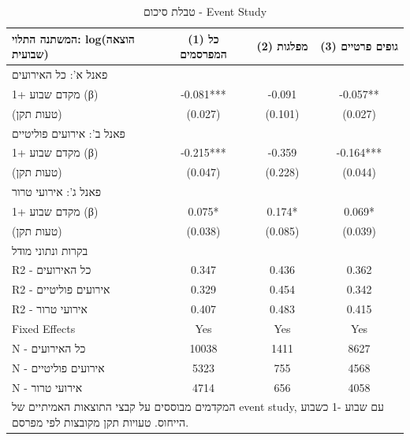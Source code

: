 \begin{table}[!htbp]
\centering
\caption{טבלת סיכום - Event Study}
\label{tab:event_study_panel_summary_baseline_minus1}
\begin{tabular}{lccc}
\hline\hline
המשתנה התלוי: log(הוצאה שבועית) & (1) כל המפרסמים & (2) מפלגות & (3) גופים פרטיים \\
\hline
\multicolumn{4}{l}{פאנל א': כל האירועים} \\
מקדם שבוע +1 (β) & -0.081*** & -0.091 & -0.057** \\
(טעות תקן) & (0.027) & (0.101) & (0.027) \\
\multicolumn{4}{l}{פאנל ב': אירועים פוליטיים} \\
מקדם שבוע +1 (β) & -0.215*** & -0.359 & -0.164*** \\
(טעות תקן) & (0.047) & (0.228) & (0.044) \\
\multicolumn{4}{l}{פאנל ג': אירועי טרור} \\
מקדם שבוע +1 (β) & 0.075* & 0.174* & 0.069* \\
(טעות תקן) & (0.038) & (0.085) & (0.039) \\
\multicolumn{4}{l}{בקרות ונתוני מודל} \\
R2 - כל האירועים & 0.347 & 0.436 & 0.362 \\
R2 - אירועים פוליטיים & 0.329 & 0.454 & 0.342 \\
R2 - אירועי טרור & 0.407 & 0.483 & 0.415 \\
Fixed Effects & Yes & Yes & Yes \\
N - כל האירועים & 10038 & 1411 & 8627 \\
N - אירועים פוליטיים & 5323 & 755 & 4568 \\
N - אירועי טרור & 4714 & 656 & 4058 \\
\hline
\multicolumn{4}{l}{\footnotesize המקדמים מבוססים על קבצי התוצאות האמיתיים של event study, עם שבוע -1 כשבוע הייחוס. טעויות תקן מקובצות לפי מפרסם.} \\
\hline\hline
\end{tabular}
\end{table}
